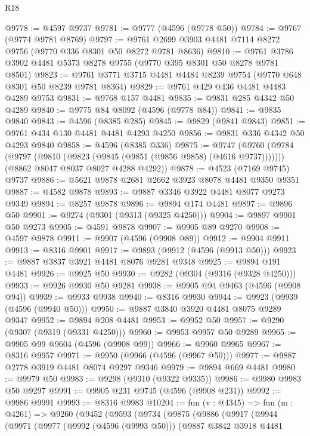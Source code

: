 \begin{lexlean}{R18}
\begin{coremodule}
@9778 := @4597 @9737
@9781 := @9777 (@4596 (@9778 @50))
@9784 := @9767 (@9774 @9781 @8769)
@9797 := @9761 @2699 @3903 @4481 @7114 @8272 @9756 (@9770 @336 @8301 @50 @8272 @9781 @8636)
@9810 := @9761 @3786 @3902 @4481 @5373 @8278 @9755 (@9770 @395 @8301 @50 @8278 @9781 @8501)
@9823 := @9761 @3771 @3715 @4481 @4484 @8239 @9754 (@9770 @648 @8301 @50 @8239 @9781 @8364)
@9829 := @9761 @429 @436 @4481 @4483 @4289 @9753
@9831 := @9768 @157 @4481
@9835 := @9831 @285 @4342 @50 @4289
@9840 := @9775 @84 @8092 (@4596 (@9778 @84))
@9841 := @9835 @9840
@9843 := @4596 (@8385 @285)
@9845 := @9829 (@9841 @9843)
@9851 := @9761 @434 @130 @4481 @4481 @4293 @4250
@9856 := @9831 @336 @4342 @50 @4293 @9840
@9858 := @4596 (@8385 @336)
@9875 := @9747
    (@9760
      (@9784 (@9797 (@9810 (@9823 (@9845 (@9851 (@9856 @9858) (@4616 @9737)))))))
      (@8862 @8047 @8037 @8027 @4288 @4292))
@9878 := @4523 (@7169 @9745) @9737
@9886 := @5621 @9878 @2681 @2662 @3923 @8078 @4481 @9350 @9351
@9887 := @4582 @9878
@9893 := @9887 @3346 @3922 @4481 @8077 @9273 @9349
@9894 := @8257 @9878
@9896 := @9894 @174 @4481
@9897 := @9896 @50
@9901 := @9274 (@9301 (@9313 (@9325 @4250)))
@9904 := @9897 @9901 @50 @9273
@9905 := @4591 @9878
@9907 := @9905 @89 @9270
@9908 := @4597 @9878
@9911 := @9907 (@4596 (@9908 @89))
@9912 := @9904 @9911
@9913 := @8316 @9901
@9917 := @9893 (@9912 (@4596 (@9913 @50)))
@9923 := @9887 @3837 @3921 @4481 @8076 @9281 @9348
@9925 := @9894 @191 @4481
@9926 := @9925 @50
@9930 := @9282 (@9304 (@9316 (@9328 @4250)))
@9933 := @9926 @9930 @50 @9281
@9938 := @9905 @94 @9463 (@4596 (@9908 @94))
@9939 := @9933 @9938
@9940 := @8316 @9930
@9944 := @9923 (@9939 (@4596 (@9940 @50)))
@9950 := @9887 @3840 @3920 @4481 @8075 @9289 @9347
@9952 := @9894 @208 @4481
@9953 := @9952 @50
@9957 := @9290 (@9307 (@9319 (@9331 @4250)))
@9960 := @9953 @9957 @50 @9289
@9965 := @9905 @99 @9604 (@4596 (@9908 @99))
@9966 := @9960 @9965
@9967 := @8316 @9957
@9971 := @9950 (@9966 (@4596 (@9967 @50)))
@9977 := @9887 @2778 @3919 @4481 @8074 @9297 @9346
@9979 := @9894 @669 @4481
@9980 := @9979 @50
@9983 := @9298 (@9310 (@9322 @9335))
@9986 := @9980 @9983 @50 @9297
@9991 := @9905 @231 @9745 (@4596 (@9908 @231))
@9992 := @9986 @9991
@9993 := @8316 @9983
@10204 := fun (v : @4345) =>
  fun (m : @4261) =>
  @9260
    (@9452
      (@9593
        (@9734
          (@9875
            (@9886
              (@9917
                (@9944
                  (@9971
                    (@9977
                      (@9992 (@4596 (@9993 @50)))
                      (@9887
                        @3842
                        @3918
                        @4481

\end{coremodule}
\end{lexlean}
